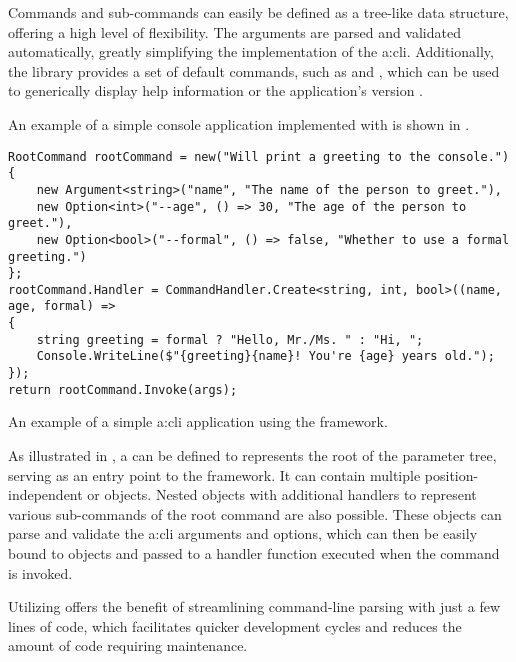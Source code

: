 Commands and sub-commands can easily be defined as a tree-like data structure, offering a high level of flexibility. The arguments are parsed and validated automatically, greatly simplifying the implementation of the \gls{a:cli}. Additionally, the library provides a set of default commands, such as  and , which can be used to generically display help information or the application's version \cite{DotnetSystemCommandlineGetStarted}. 

An example of a simple console application implemented with  is shown in .

\begin{listing}[H]
\begin{verbatim}
RootCommand rootCommand = new("Will print a greeting to the console.")
{
    new Argument<string>("name", "The name of the person to greet."),
    new Option<int>("--age", () => 30, "The age of the person to greet."),
    new Option<bool>("--formal", () => false, "Whether to use a formal greeting.")
};
rootCommand.Handler = CommandHandler.Create<string, int, bool>((name, age, formal) =>
{
    string greeting = formal ? "Hello, Mr./Ms. " : "Hi, ";
    Console.WriteLine($"{greeting}{name}! You're {age} years old.");
});
return rootCommand.Invoke(args);
\end{verbatim}
\caption{An example of a simple \gls{a:cli} application using the  framework.}
\label{lst:cli-example}
\end{listing}

As illustrated in , a  can be defined to represents the root of the parameter tree, serving as an entry point to the framework. It can contain multiple position-independent  or  objects. Nested  objects with additional handlers to represent various sub-commands of the root command are also possible. These objects can parse and validate the \gls{a:cli} arguments and options, which can then be easily bound to objects and passed to a handler function executed when the command is invoked.

Utilizing  offers the benefit of streamlining command-line parsing with just a few lines of code, which facilitates quicker development cycles and reduces the amount of code requiring maintenance.

